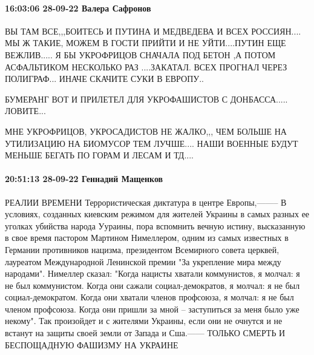 \paragraph{16:03:06 28-09-22 Валера Сафронов}

ВЫ ТАМ ВСЕ,,,БОИТЕСЬ И ПУТИНА И МЕДВЕДЕВА И ВСЕХ РОССИЯН.... МЫ Ж ТАКИЕ, МОЖЕМ
В ГОСТИ ПРИЙТИ И НЕ УЙТИ....ПУТИН ЕЩЕ ВЕЖЛИВ..... Я БЫ УКРОФРИЦОВ СНАЧАЛА ПОД
БЕТОН ,А ПОТОМ АСФАЛЬТИКОМ НЕСКОЛЬКО РАЗ ....ЗАКАТАЛ. ВСЕХ ПРОГНАЛ ЧЕРЕЗ
ПОЛИГРАФ... ИНАЧЕ СКАЧИТЕ СУКИ В ЕВРОПУ..

БУМЕРАНГ ВОТ И ПРИЛЕТЕЛ ДЛЯ УКРОФАШИСТОВ С ДОНБАССА..... ЛОВИТЕ...

МНЕ УКРОФРИЦОВ, УКРОСАДИСТОВ НЕ ЖАЛКО,,, ЧЕМ БОЛЬШЕ НА УТИЛИЗАЦИЮ НА БИОМУСОР
ТЕМ ЛУЧШЕ.... НАШИ ВОЕННЫЕ БУДУТ МЕНЬШЕ БЕГАТЬ ПО ГОРАМ И ЛЕСАМ И ТД....

\paragraph{20:51:13 28-09-22 Геннадий Мащенков}

РЕАЛИИ ВРЕМЕНИ Террористическая диктатура в центре Европы,-------- В условиях, созданных киевским режимом для жителей Украины в самых
разных ее уголках убийства народа Уураины, пора вспомнить вечную истину, высказанную в свое
время пастором Мартином Нимеллером, одним из самых известных в Германии
противников нацизма, президентом Всемирного совета церквей, лауреатом
Международной Ленинской премии "За укрепление мира между народами".
Нимеллер сказал: "Когда нацисты хватали коммунистов, я молчал: я не был
коммунистом. Когда они сажали социал-демократов, я молчал: я не был
социал-демократом. Когда они хватали членов профсоюза, я молчал: я не
был членом профсоюза. Когда они пришли за мной – заступиться за меня
было уже некому".
Так произойдет и с жителями Украины, если они не очнутся и не встанут на защиты своей земли от Запада и Сша.------ ТОЛЬКО СМЕРТЬ И БЕСПОЩАДНУЮ ФАШИЗМУ НА УКРАИНЕ

